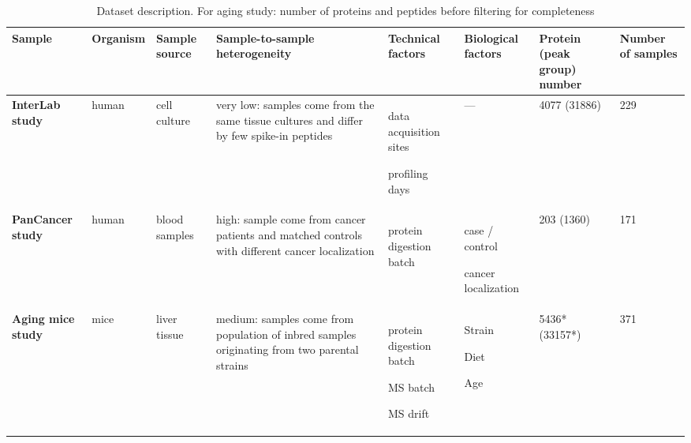 \documentclass[num-refs]{wiley-article}
\newcommand{\squishlist}{%
	\begin{list}{-}%
		{\setlength{\itemsep}{0pt}
			\setlength{\parsep}{0pt}
			\setlength{\topsep}{0pt}
			\setlength{\partopsep}{0pt}
			\setlength{\leftmargin}{1em}
			\setlength{\labelwidth}{1em}
			\setlength{\labelsep}{0.5em}}}
\newcommand{\squishend}{\end{list}}
\begin{document}
\begin{landscape}
	\begin{table}
		\renewcommand*{\arraystretch}{1.8}
		\caption[Dataset description]{Dataset description. For aging study: number of proteins and peptides before filtering for completeness}
		\label{tab:batch_datasets}
		\small
		\begin{tabular}{|  m{1.75cm}|  m{1.15cm} |  >{\raggedright}m{1.5cm} | >{\raggedright}m{4.13cm} |  m{2.5cm} |  >{\raggedright}m{2.2cm} |  m{1.5cm} |  m{1.5cm} |}
			\hline
			\textbf{Sample} & \textbf{Organism} & \textbf{Sample source} & \textbf{Sample-to-sample heterogeneity} & \textbf{Technical factors} & \textbf{Biological factors} & \textbf{Protein (peak group) number} & \textbf{Number of samples} \\
			\hline
			\hline
			\textbf{InterLab study} & human & cell culture & very low: 
			samples come from the same tissue cultures and differ by few spike-in peptides
			& \vspace*{1em}\squishlist
			\item data acquisition sites
			\item profiling days
			\squishend
			& --- & 4077
			(31886)
			& 229  \\
			\hline
			\textbf{PanCancer study} & human & blood samples & high: 
			sample come from cancer patients and matched controls with different cancer localization
			& \squishlist
			\item protein digestion batch
			\squishend
			& \squishlist
			\item case / control
			\item cancer localization
			\squishend
			& 203 (1360)
			& 171  \\
			\hline
			\textbf{Aging mice study} & mice & liver tissue & medium: 
			samples come from population of inbred samples originating from two parental strains
			&  \vspace*{1em}\squishlist
			\item protein digestion batch
			\item MS batch
			\item MS drift
			\squishend
			& \squishlist
			\item Strain
			\item Diet
			\item Age
			\squishend
			& 5436*
			(33157*)
			& 371  \\
			\hline
		\end{tabular}
	\end{table}
\end{landscape}
\end{document}
